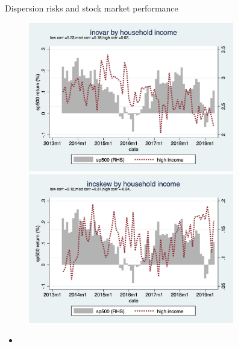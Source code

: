 \documentclass{beamer}
\begin{document}



\begin{frame}{Dispersion risks and stock market performance}
	\begin{figure}
		\centering
		\label{ts_stk_hhinc}
		\includegraphics[width=0.8\textwidth, height=\0.4\textheight]{figures/ts_incvar_HHinc_g_mean_stk} \\
		\includegraphics[width=0.8\textwidth, height=\0.4\textheight]{figures/ts_incskew_HHinc_g_mean_stk} 
	\end{figure}
	\begin{itemize}
		\item 
	\end{itemize}
\end{frame}
\end{document}
